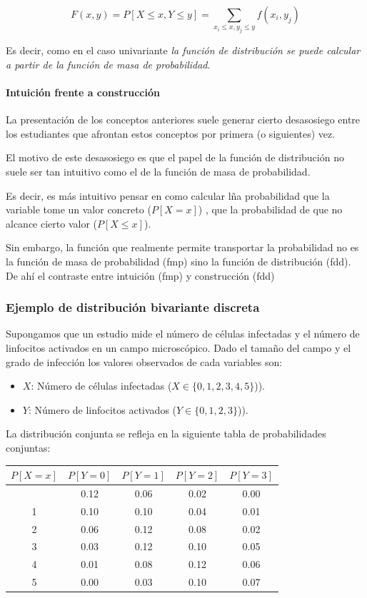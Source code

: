 \documentclass[
]{article}
\providecommand{\tightlist}{%
  \setlength{\itemsep}{0pt}\setlength{\parskip}{0pt}}
\begin{document}
\[
F(x, y) = P[X \leq x, Y \leq y] = \sum_{x_i \leq x, y_j \leq y} f(x_i, y_j)
\]

Es decir, como en el caso univariante \emph{la función de distribución se puede calcular a partir de la función de masa de probabilidad}.

\paragraph{Intuición frente a construcción}\label{intuiciuxf3n-frente-a-construcciuxf3n}

La presentación de los conceptos anteriores suele generar cierto desasosiego entre los estudiantes que afrontan estos conceptos por primera (o siguientes) vez.

El motivo de este desasosiego es que el papel de la función de distribución no suele ser tan intuitivo como el de la función de masa de probabilidad.

Es decir, es más intuitivo pensar en como calcular lña probabilidad que la variable tome un valor concreto (\(P[X=x]\)) , que la probabilidad de que no alcance cierto valor (\(P[X\leq x]\)).

Sin embargo, la función que realmente permite transportar la probabilidad no es la función de masa de probabilidad (fmp) sino la función de distribución (fdd). De ahí el contraste entre intuición (fmp) y construcción (fdd)

\subsubsection{Ejemplo de distribución bivariante discreta}\label{ejemplo-de-distribuciuxf3n-bivariante-discreta}

Supongamos que un estudio mide el número de células infectadas y el número de linfocitos activados en un campo microscópico. Dado el tamaño del campo y el grado de infección los valores observados de cada variables son:

\begin{itemize}
\tightlist
\item
  \(X\): Número de células infectadas (\(X \in \{0, 1, 2, 3, 4, 5\}\))).
\item
  \(Y\): Número de linfocitos activados (\(Y \in \{0, 1, 2, 3\}\))).
\end{itemize}

La distribución conjunta se refleja en la siguiente tabla de probabilidades conjuntas:

\begin{longtable}[]{@{}ccccc@{}}
\toprule\noalign{}
\(P[X=x]\) & \(P[Y = 0]\) & \(P[Y = 1]\) & \(P[Y = 2]\) & \(P[Y = 3]\) \\
\midrule\noalign{}
\endhead
\bottomrule\noalign{}
\endlastfoot
0 & 0.12 & 0.06 & 0.02 & 0.00 \\
1 & 0.10 & 0.10 & 0.04 & 0.01 \\
2 & 0.06 & 0.12 & 0.08 & 0.02 \\
3 & 0.03 & 0.12 & 0.10 & 0.05 \\
4 & 0.01 & 0.08 & 0.12 & 0.06 \\
5 & 0.00 & 0.03 & 0.10 & 0.07 \\
\end{longtable}
\end{document}
